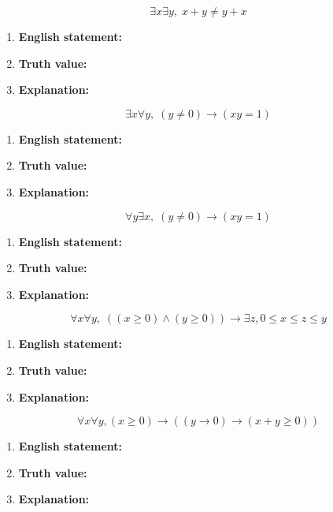 \documentclass[]{article}
\begin{document}
\begin{question}{1.5}
\[
\exists x \exists y,\; x + y\ne y +x
\]
\end{question}
\begin{enumerate}[label=(\alph*)]
    \item \textbf{English statement:}
    \item \textbf{Truth value:}
    \item \textbf{Explanation:}
\end{enumerate}

\begin{question}{1.6}
\[
\exists x \forall y,\; (y \ne 0) \rightarrow (xy = 1)
\]
\end{question}
\begin{enumerate}[label=(\alph*)]
    \item \textbf{English statement:}
    \item \textbf{Truth value:}
    \item \textbf{Explanation:}
\end{enumerate}

\begin{question}{1.7}
\[
\forall y \exists x,\; (y \ne 0) \rightarrow (xy = 1)
\]
\end{question}
\begin{enumerate}[label=(\alph*)]
    \item \textbf{English statement:}
    \item \textbf{Truth value:}
    \item \textbf{Explanation:}
\end{enumerate}

\begin{question}{1.8}
\[
\forall x\forall y,\; ((x \ge 0) \land (y \ge 0)) \rightarrow \exists z, 0 \le x \le z \le y
\]
\end{question}
\begin{enumerate}[label=(\alph*)]
    \item \textbf{English statement:}
    \item \textbf{Truth value:}
    \item \textbf{Explanation:}
\end{enumerate}

\begin{question}{1.9}
\[
\forall x\forall y, (x \ge 0) \rightarrow ((y \rightarrow 0) \rightarrow ( x + y \ge 0))
\]
\end{question}
\begin{enumerate}[label=(\alph*)]
    \item \textbf{English statement:}
    \item \textbf{Truth value:}
    \item \textbf{Explanation:}
\end{enumerate}
\end{document}

